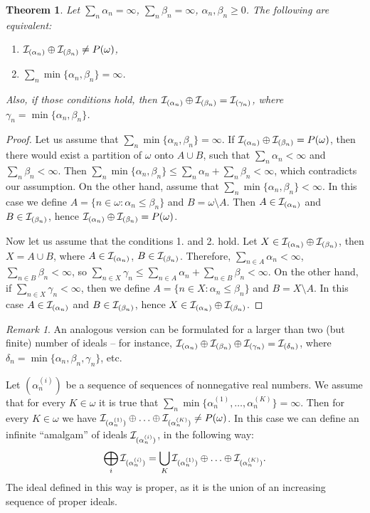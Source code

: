 \documentclass[12pt]{article}
\theoremstyle{plain}
\newtheorem{theorem}{Theorem}[section]
\theoremstyle{definition}
\theoremstyle{remark}
\newtheorem*{remark}{Remark}
\newcommand{\cI}{{\cal I}}
\begin{document}
\begin{theorem}
Let $\sum_n \alpha_n = \infty$, $\sum_n \beta_n = \infty$,
$\alpha_n, \beta_n \geq 0$. The following are equivalent:
\begin{enumerate}
\item
  $\cI_{(\alpha_n)} \oplus \cI_{(\beta_n)} \not = P(\omega)$,
\item
  $\sum_n \min\{\alpha_n,\beta_n\} = \infty$.
\end{enumerate}
Also, if those conditions hold, then $\cI_{(\alpha_n)} \oplus \cI_{(\beta_n)} = \cI_{(\gamma_n)}$,
where $\gamma_n = \min\{\alpha_n,\beta_n\}$.
\end{theorem}
\begin{proof}
Let us assume that $\sum_n \min\{\alpha_n,\beta_n\} = \infty$. If 
$\cI_{(\alpha_n)} \oplus \cI_{(\beta_n)} = P(\omega)$, then there would exist a partition of $\omega$ onto $A \cup B$, such that 
$\sum_n \alpha_n < \infty$ and $\sum_n \beta_n < \infty$.
Then $\sum_n \min\{\alpha_n,\beta_n\} \leq \sum_n \alpha_n + \sum_n \beta_n < \infty$,
which contradicts our assumption.
On the other hand, assume that $\sum_n \min\{\alpha_n,\beta_n\} < \infty$. In this case we define $A = \{n \in \omega \colon \alpha_n \leq \beta_n\}$
and $B = \omega \setminus A$. Then 
$A \in \cI_{(\alpha_n)}$ and $B \in \cI_{(\beta_n)}$, hence 
$\cI_{(\alpha_n)} \oplus \cI_{(\beta_n)} = P(\omega)$.
  
Now let us assume that the conditions 1. and 2. hold. Let $X \in \cI_{(\alpha_n)} \oplus \cI_{(\beta_n)}$, then
$X = A \cup B$, where $A \in \cI_{(\alpha_n)}$,
$B \in \cI_{(\beta_n)}$. Therefore, $\sum_{n\in A} \alpha_n < \infty$, 
$\sum_{n\in B} \beta_n < \infty$, so 
$\sum_{n\in X} \gamma_n \leq \sum_{n\in A} \alpha_n + \sum_{n\in B} \beta_n < \infty$.
On the other hand, if $\sum_{n\in X} \gamma_n < \infty$, then we define $A = \{n\in X\colon \alpha_n \leq \beta_n \}$ and 
$B = X \setminus A$. In this case $A \in \cI_{(\alpha_n)}$ and
$B \in \cI_{(\beta_n)}$, hence
$X\in\cI_{(\alpha_n)} \oplus \cI_{(\beta_n)}$.
\end{proof}

\begin{remark}
An analogous version can be formulated for a larger than two (but finite) number of ideals -- for instance, $\cI_{(\alpha_n)} \oplus \cI_{(\beta_n)} \oplus \cI_{(\gamma_n)} = \cI_{(\delta_n)}$, where $\delta_n = \min\{\alpha_n,\beta_n, \gamma_n\}$, etc.
\end{remark}

Let $(\alpha_n^{(i)})$ be a sequence of sequences of nonnegative real numbers. We assume that for every $K \in \omega$ it is true that $\sum_n \min \{\alpha_n^{(1)}, \ldots, \alpha_n^{(K)}\} = \infty$. Then for every $K \in \omega$ we have
$\cI_{(\alpha_n^{(1)})} \oplus\ldots\oplus \cI_{(\alpha_n^{(K)})} \not= P(\omega)$.
In this case we can define an infinite ``amalgam'' of ideals $\cI_{(\alpha_n^{(i)})}$, in the following way:			 
$$\bigoplus_{i}\cI_{(\alpha_n^{(i)})} = \bigcup_{K} \cI_{(\alpha_n^{(1)})} \oplus\ldots\oplus \cI_{(\alpha_n^{(K)})}.$$
The ideal defined in this way is proper, as it is the union of an increasing sequence of proper ideals.\\
\end{document}
